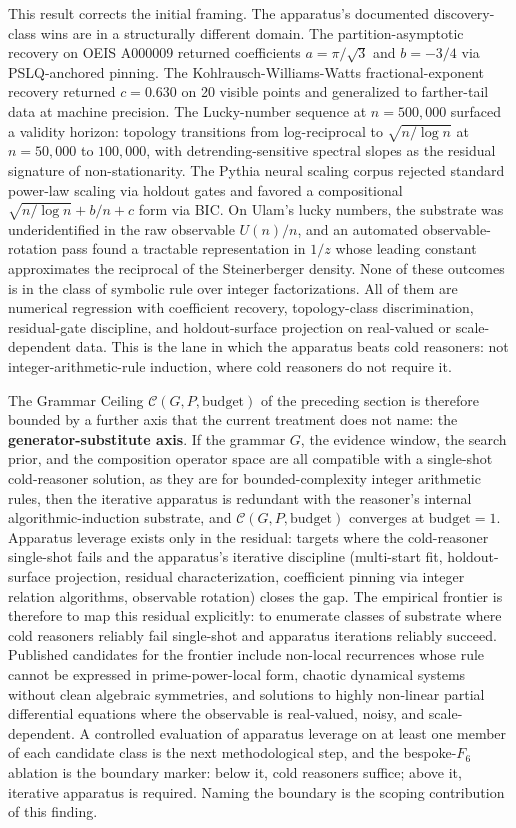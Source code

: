\documentclass[11pt]{article}
\begin{document}
This result corrects the initial framing. The apparatus's documented discovery-class wins are in a structurally different domain. The partition-asymptotic recovery on OEIS A000009 returned coefficients $a = \pi/\sqrt{3}$ and $b = -3/4$ via PSLQ-anchored pinning. The Kohlrausch-Williams-Watts fractional-exponent recovery returned $c = 0.630$ on 20 visible points and generalized to farther-tail data at machine precision. The Lucky-number sequence at $n = 500{,}000$ surfaced a validity horizon: topology transitions from log-reciprocal to $\sqrt{n/\log n}$ at $n = 50{,}000$ to $100{,}000$, with detrending-sensitive spectral slopes as the residual signature of non-stationarity. The Pythia neural scaling corpus rejected standard power-law scaling via holdout gates and favored a compositional $\sqrt{n/\log n} + b/n + c$ form via BIC. On Ulam's lucky numbers, the substrate was underidentified in the raw observable $U(n)/n$, and an automated observable-rotation pass found a tractable representation in $1/z$ whose leading constant approximates the reciprocal of the Steinerberger density. None of these outcomes is in the class of symbolic rule over integer factorizations. All of them are numerical regression with coefficient recovery, topology-class discrimination, residual-gate discipline, and holdout-surface projection on real-valued or scale-dependent data. This is the lane in which the apparatus beats cold reasoners: not integer-arithmetic-rule induction, where cold reasoners do not require it.

The Grammar Ceiling $\mathcal{C}(G, P, \text{budget})$ of the preceding section is therefore bounded by a further axis that the current treatment does not name: the \textbf{generator-substitute axis}. If the grammar $G$, the evidence window, the search prior, and the composition operator space are all compatible with a single-shot cold-reasoner solution, as they are for bounded-complexity integer arithmetic rules, then the iterative apparatus is redundant with the reasoner's internal algorithmic-induction substrate, and $\mathcal{C}(G, P, \text{budget})$ converges at $\text{budget} = 1$. Apparatus leverage exists only in the residual: targets where the cold-reasoner single-shot fails and the apparatus's iterative discipline (multi-start fit, holdout-surface projection, residual characterization, coefficient pinning via integer relation algorithms, observable rotation) closes the gap. The empirical frontier is therefore to map this residual explicitly: to enumerate classes of substrate where cold reasoners reliably fail single-shot and apparatus iterations reliably succeed. Published candidates for the frontier include non-local recurrences whose rule cannot be expressed in prime-power-local form, chaotic dynamical systems without clean algebraic symmetries, and solutions to highly non-linear partial differential equations where the observable is real-valued, noisy, and scale-dependent. A controlled evaluation of apparatus leverage on at least one member of each candidate class is the next methodological step, and the bespoke-$F_6$ ablation is the boundary marker: below it, cold reasoners suffice; above it, iterative apparatus is required. Naming the boundary is the scoping contribution of this finding.
\end{document}
